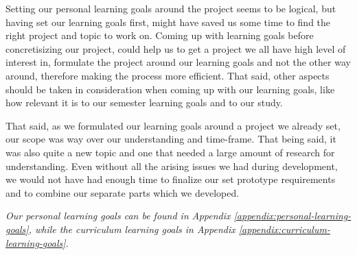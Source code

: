 Setting our personal learning goals around the project seems to be logical, but having set our learning goals first, might have saved us some time to find the right project and topic to work on. Coming up with learning goals before concretisizing our project, could help us to get a project we all have high level of interest in, formulate the project around our learning goals and not the other way around, therefore making the process more efficient. That said, other aspects should be taken in consideration when coming up with our learning goals, like how relevant it is to our semester learning goals and to our study.

That said, as we formulated our learning goals around a project we already set, our scope was way over our understanding and time-frame. That being said, it was also quite a new topic and one that needed a large amount of research for understanding. Even without all the arising issues we had during development, we would not have had enough time to finalize our set prototype requirements and to combine our separate parts which we developed.

\textit{Our personal learning goals can be found in Appendix \ref{appendix:personal-learning-goals}, while the curriculum learning goals in Appendix \ref{appendix:curriculum-learning-goals}.}

